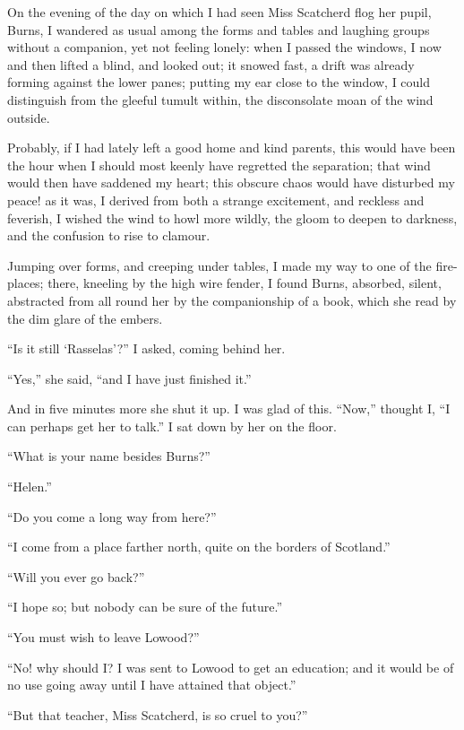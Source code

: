 On the evening of the day on which I had seen Miss Scatcherd flog her
pupil, Burns, I wandered as usual among the forms and tables and
laughing groups without a companion, yet not feeling lonely: when I
passed the windows, I now and then lifted a blind, and looked out; it
snowed fast, a drift was already forming against the lower panes;
putting my ear close to the window, I could distinguish from the gleeful
tumult within, the disconsolate moan of the wind outside.

Probably, if I had lately left a good home and kind parents, this would
have been the hour when I should most keenly have regretted the
separation; that wind would then have saddened my heart; this obscure
chaos would have disturbed my peace! as it was, I derived from both a
strange excitement, and reckless and feverish, I wished the wind to howl
more wildly, the gloom to deepen to darkness, and the confusion to rise
to clamour.

Jumping over forms, and creeping under tables, I made my way to one of
the fire-places; there, kneeling by the high wire fender, I found Burns,
absorbed, silent, abstracted from all round her by the companionship of
a book, which she read by the dim glare of the embers.

\enquote{Is it still \enquote{Rasselas}?} I asked, coming behind her.

\enquote{Yes,} she said, \enquote{and I have just finished it.}

And in five minutes more she shut it up.  I was glad of this. 
\enquote{Now,} thought I, \enquote{I can perhaps get her to talk.}  I
sat down by her on the floor.

\enquote{What is your name besides Burns?}

\enquote{Helen.}

\enquote{Do you come a long way from here?}

\enquote{I come from a place farther north, quite on the borders of
Scotland.}

\enquote{Will you ever go back?}

\enquote{I hope so; but nobody can be sure of the future.}

\enquote{You must wish to leave Lowood?}

\enquote{No! why should I?  I was sent to Lowood to get an education;
and it would be of no use going away until I have attained that object.}

\enquote{But that teacher, Miss Scatcherd, is so cruel to you?}

